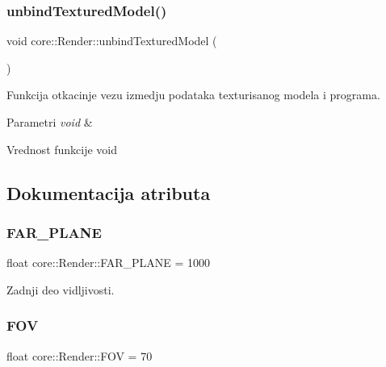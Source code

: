 \subsubsection{\texorpdfstring{unbind\+Textured\+Model()}{unbindTexturedModel()}}
{\footnotesize\ttfamily void core\+::\+Render\+::unbind\+Textured\+Model (\begin{DoxyParamCaption}{ }\end{DoxyParamCaption})}



Funkcija otkacinje vezu izmedju podataka texturisanog modela i programa. 


\begin{DoxyParams}{Parametri}
{\em void} & \\
\hline
\end{DoxyParams}
\begin{DoxyReturn}{Vrednost funkcije}
void 
\end{DoxyReturn}


\subsection{Dokumentacija atributa}
\mbox{\label{classcore_1_1Render_a331f4b9d510f06bbbbf85f06ac8995a2}} 
\subsubsection{\texorpdfstring{F\+A\+R\+\_\+\+P\+L\+A\+NE}{FAR\_PLANE}}
{\footnotesize\ttfamily float core\+::\+Render\+::\+F\+A\+R\+\_\+\+P\+L\+A\+NE = 1000\hspace{0.3cm}{\ttfamily [private]}}



Zadnji deo vidljivosti. 

\mbox{\label{classcore_1_1Render_aab61f8ad63c67621572d45c3debfaff2}} 
\subsubsection{\texorpdfstring{F\+OV}{FOV}}
{\footnotesize\ttfamily float core\+::\+Render\+::\+F\+OV = 70\hspace{0.3cm}{\ttfamily [private]}}



